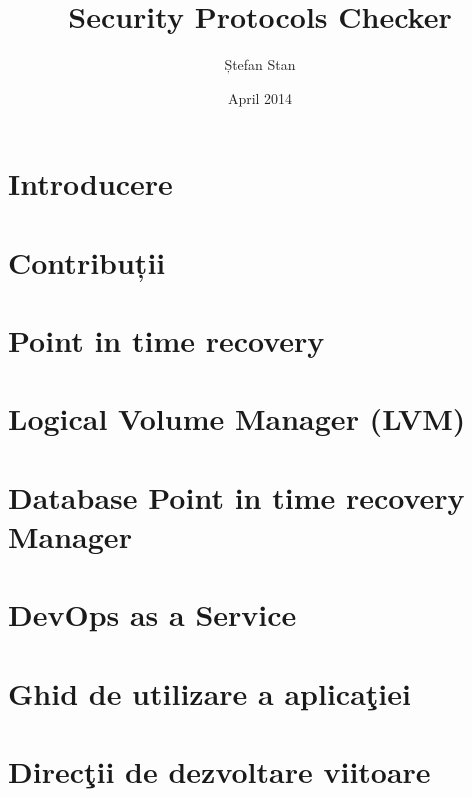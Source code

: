 \documentclass[12, twoside]{report}
\title{
	{Security Protocols Checker}
}
\author{Ștefan Stan}
\date{April 2014}
\begin{document}

\newpage

\newpage

\tableofcontents

\renewcommand{\baselinestretch}{1.5} 

\renewcommand{\bibname}{Bibliografie}

\chapter*{Introducere}


\chapter*{Contribuții}


\chapter{Point in time recovery}


\chapter{Logical Volume Manager (LVM)}


\chapter{Database Point in time recovery Manager}


\chapter{DevOps as a Service}


\chapter{Ghid de utilizare a aplicaţiei}


\chapter{Direcţii de dezvoltare viitoare}

\end{document}
